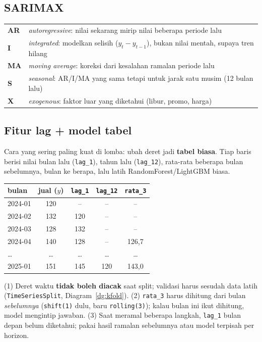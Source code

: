 \documentclass[10pt,a4paper]{article}
\newcommand{\kode}[1]{\texttt{\small #1}}
\begin{document}
\subsection{SARIMAX}
{\small
\begin{tabularx}{\linewidth}{@{}>{\bfseries}p{1.6cm}X@{}}
\toprule
AR & \emph{autoregressive}: nilai sekarang mirip nilai beberapa periode lalu\\
I & \emph{integrated}: modelkan selisih ($y_t - y_{t-1}$), bukan nilai mentah, supaya tren hilang\\
MA & \emph{moving average}: koreksi dari kesalahan ramalan periode lalu\\
S & \emph{seasonal}: AR/I/MA yang sama tetapi untuk jarak satu musim (12 bulan lalu)\\
X & \emph{exogenous}: faktor luar yang diketahui (libur, promo, harga)\\ \bottomrule
\end{tabularx}}

\subsection{Fitur lag + model tabel}
\begin{inti}[hijau1]
Cara yang sering paling kuat di lomba: ubah deret jadi \textbf{tabel biasa}. Tiap baris berisi nilai bulan lalu (\kode{lag\_1}),
tahun lalu (\kode{lag\_12}), rata-rata beberapa bulan sebelumnya, bulan ke berapa, lalu latih RandomForest/LightGBM biasa.
\end{inti}
\begin{center}
\small
\begin{tabular}{@{}lcccc@{}}
\toprule
bulan & jual ($y$) & \kode{lag\_1} & \kode{lag\_12} & \kode{rata\_3}\\ \midrule
2024-01 & 120 & -- & -- & --\\
2024-02 & 132 & 120 & -- & --\\
2024-03 & 128 & 132 & -- & --\\
2024-04 & 140 & 128 & -- & 126{,}7\\
\dots & \dots & \dots & \dots & \dots\\
2025-01 & 151 & 145 & 120 & 143{,}0\\ \bottomrule
\end{tabular}
\end{center}

\begin{jebak}
(1) Deret waktu \textbf{tidak boleh diacak} saat split; validasi harus sesudah data latih (\kode{TimeSeriesSplit},
Diagram~\ref{dg:kfold}). (2) \kode{rata\_3} harus dihitung dari bulan \emph{sebelumnya} (\kode{shift(1)} dulu, baru
\kode{rolling(3)}); kalau bulan ini ikut dihitung, model mengintip jawaban. (3) Saat meramal beberapa langkah, \kode{lag\_1} bulan
depan belum diketahui; pakai hasil ramalan sebelumnya atau model terpisah per horizon.
\end{jebak}
\end{document}
